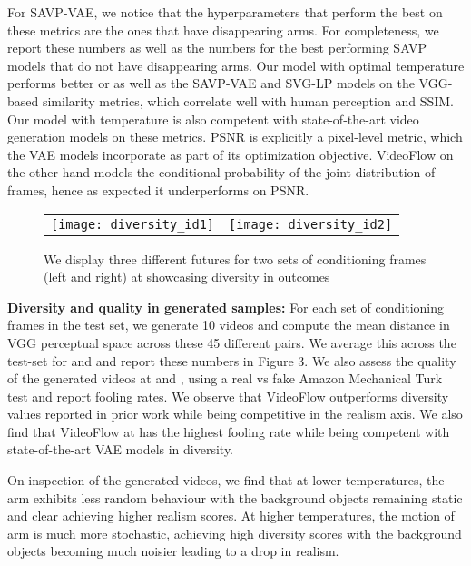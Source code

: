 \documentclass{article} \usepackage{iclr2020_conference,times}
\begin{document}
For SAVP-VAE, we notice that the hyperparameters that perform the best on these metrics are the ones that have disappearing arms. For completeness, we report these numbers as well as the numbers for the best performing SAVP models that do not have disappearing arms. Our model with optimal temperature performs better or as well as the SAVP-VAE and SVG-LP models on the VGG-based similarity metrics, which correlate well with human perception \citep{zhang2018unreasonable} and SSIM. Our model with temperature  is also competent with state-of-the-art video generation models on these metrics. PSNR is explicitly a pixel-level metric, which the VAE models incorporate as part of its optimization objective. VideoFlow on the other-hand models the conditional probability of the joint distribution of frames, hence as expected it underperforms on PSNR.

\begin{figure}[h]
\centering
\begin{tabular}{cc}
\texttt{[image: diversity\_id1]} &
\texttt{[image: diversity\_id2]} \\
\end{tabular}
\caption{We display three different futures for two sets of conditioning frames (left and right) at  showcasing diversity in outcomes}
\label{fig:diversity}
\end{figure}

\textbf{Diversity and quality in generated samples:} For each set of conditioning frames in the test set, we generate 10 videos and compute the mean distance in VGG perceptual space across these 45 different pairs. We average this across the test-set for  and  and report these numbers in Figure 3. We also assess the quality of the generated videos at  and , using a real vs fake Amazon Mechanical Turk test and report fooling rates. We observe that VideoFlow outperforms diversity values reported in prior work \citep{lee2018stochastic} while being competitive in the realism axis. 
We also find that VideoFlow at  has the highest fooling rate while being competent with state-of-the-art VAE models in diversity.

On inspection of the generated videos, we find that at lower temperatures,
the arm exhibits less random behaviour with the background objects remaining static and clear achieving higher realism scores. At higher
temperatures, the motion of arm is much more stochastic, achieving high diversity scores with the background objects becoming much noisier leading to a drop in realism.
\end{document}
